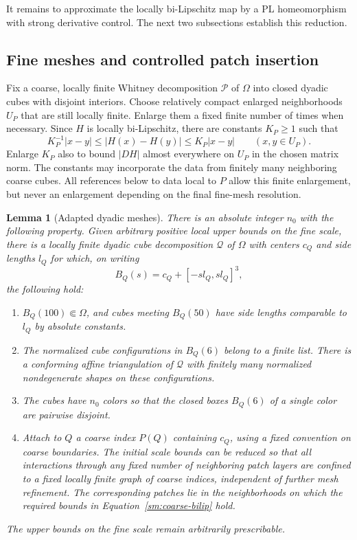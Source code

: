 \documentclass[11pt]{article}
\numberwithin{equation}{section}
\newtheorem{lemma}[theorem]{Lemma}
\theoremstyle{definition}
\theoremstyle{remark}
\begin{document}
It remains to approximate the locally bi-Lipschitz map by a PL
homeomorphism with strong derivative control.  The next two
subsections establish this reduction.

\subsection{Fine meshes and controlled patch insertion}

Fix a coarse, locally finite Whitney decomposition $\mathcal P$ of
$\Omega$ into closed dyadic cubes with disjoint interiors.  Choose
relatively compact enlarged neighborhoods $U_P$ that are still locally
finite.  Enlarge them a fixed finite number of times when necessary.
Since $H$ is locally bi-Lipschitz, there are constants $K_P\ge1$ such
that
\begin{equation}
 \label{sm:coarse-bilip}
 K_P^{-1}|x-y|\le |H(x)-H(y)|\le K_P|x-y|
 \qquad(x,y\in U_P).
\end{equation}
Enlarge $K_P$ also to bound $|DH|$ almost everywhere on $U_P$ in the
chosen matrix norm.  The constants may incorporate the data from finitely many neighboring
coarse cubes.  All references below to data local to $P$ allow this
finite enlargement, but never an enlargement depending on the final
fine-mesh resolution.

\begin{lemma}[Adapted dyadic meshes]
\label{sm:mesh}
There is an absolute integer $n_0$ with the following property.
Given arbitrary positive local upper bounds on the fine scale, there
is a locally finite dyadic cube decomposition $\mathcal Q$ of $\Omega$
with centers $c_Q$ and side lengths $l_Q$ for which, on writing
\begin{equation}
 \label{sm:patch-box}
 B_Q(s)=c_Q+[-s l_Q,s l_Q]^3,
\end{equation}
the following hold:
\begin{enumerate}[label=\textup{(\roman*)}]
 \item $B_Q(100)\Subset\Omega$, and cubes meeting $B_Q(50)$ have
 side lengths comparable to $l_Q$ by absolute constants.
 \item The normalized cube configurations in $B_Q(6)$ belong to a
 finite list.  There is a conforming affine triangulation of
 $\mathcal Q$ with finitely many normalized nondegenerate shapes
 on these configurations.
 \item The cubes have $n_0$ colors so that the closed boxes $B_Q(6)$
 of a single color are pairwise disjoint.
 \item Attach to $Q$ a coarse index $P(Q)$ containing $c_Q$, using
 a fixed convention on coarse boundaries.  The initial scale
 bounds can be reduced so that all interactions through any fixed
 number of neighboring patch layers are confined to a fixed
 locally finite graph of coarse indices, independent of further
 mesh refinement.  The corresponding patches lie in the
 neighborhoods on which the required bounds in
 Equation~\eqref{sm:coarse-bilip} hold.
\end{enumerate}
The upper bounds on the fine scale remain arbitrarily prescribable.
\end{lemma}
\end{document}
